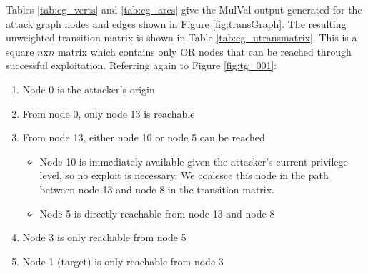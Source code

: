 Tables \ref{tab:eg_verts} and \ref{tab:eg_arcs} give the MulVal output generated for the attack graph nodes and edges shown in Figure \ref{fig:transGraph}. The resulting unweighted transition matrix is shown in Table \ref{tab:eg_utransmatrix}. This is a square $n$x$n$ matrix which contains only OR nodes that can be reached through successful exploitation. Referring again to Figure \ref{fig:tg_001}:
\begin{enumerate}
\item Node 0 is the attacker's origin
\item From node 0, only node 13 is reachable
\item From node 13, either node 10 or node 5 can be reached
\begin{itemize}
\item Node 10 is immediately available given the attacker's current privilege level, so no exploit is necessary. We coalesce this node in the path between node 13 and node 8 in the transition matrix.
\item Node 5 is directly reachable from node 13 and node 8
\end{itemize}
\item Node 3 is only reachable from node 5
\item Node 1 (target) is only reachable from node 3
\end{enumerate}



